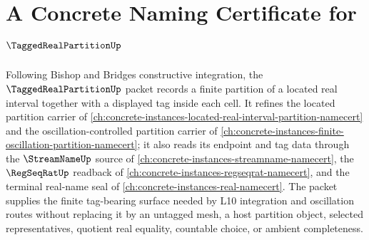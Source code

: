 \chapter{A Concrete Naming Certificate for $\TaggedRealPartitionUp$}
\label{ch:concrete-instances-tagged-real-partition-namecert}

Following Bishop and Bridges constructive integration, the $\TaggedRealPartitionUp$ packet records a finite partition of a located real interval together with a displayed tag inside each cell. It refines the located partition carrier of \autoref{ch:concrete-instances-located-real-interval-partition-namecert} and the oscillation-controlled partition carrier of \autoref{ch:concrete-instances-finite-oscillation-partition-namecert}; it also reads its endpoint and tag data through the $\StreamNameUp$ source of \autoref{ch:concrete-instances-streamname-namecert}, the $\RegSeqRatUp$ readback of \autoref{ch:concrete-instances-regseqrat-namecert}, and the terminal real-name seal of \autoref{ch:concrete-instances-real-namecert}. The packet supplies the finite tag-bearing surface needed by L10 integration and oscillation routes without replacing it by an untagged mesh, a host partition object, selected representatives, quotient real equality, countable choice, or ambient completeness.

